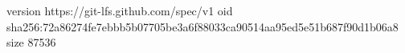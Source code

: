 version https://git-lfs.github.com/spec/v1
oid sha256:72a86274fe7ebbb5b07705be3a6f88033ca90514aa95ed5e51b687f90d1b06a8
size 87536
